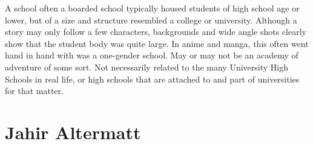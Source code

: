 \documentclass[12pt]{book}
\begin{document}
A school  often a boarded school  typically housed students of high school age or lower, but of a size and structure resembled a college or university. Although a story may only follow a few characters, backgrounds and wide angle shots clearly show that the student body was quite large. In anime and manga, this often went hand in hand with was a one-gender school. May or may not be an academy of adventure of some sort. Not necessarily related to the many University High Schools in real life, or high schools that are attached to and part of universities for that matter.



\chapter{Jahir Altermatt}
\end{document}
